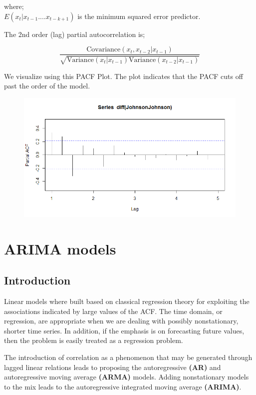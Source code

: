 \documentclass[a4paper]{article}
\theoremstyle{definition}
\begin{document}
where; \\
$ E(x_t |x_{t-1} .... x_{t-k+1}) $ is the minimum squared error predictor. 

The 2nd order (lag) partial autocorrelation is; 

\begin{equation}
\frac{\text{Covariance}(x_t, x_{t-2}| x_{t-1})}{\sqrt{\text{Variance}(x_t|x_{t-1})\text{Variance}(x_{t-2}|x_{t-1})}}
\end{equation}

We visualize using this PACF Plot. The plot indicates that the PACF cuts off past the order of the model. 

\begin{figure}
	[h]
	\centering
	\includegraphics[width=0.8\linewidth]{pacf_jj}
\end{figure}

\section{ARIMA models}
\subsection{Introduction}
Linear models where built based on classical regression theory for exploiting the associations
indicated by large values of the ACF. The time domain, or regression, are appropriate when we are dealing with possibly nonstationary, shorter time series. In addition, if the emphasis is on
forecasting future values, then the problem is easily treated as a regression problem. 

The introduction of correlation as a phenomenon that may be generated through lagged linear relations leads to proposing the autoregressive \textbf{(AR)} and autoregressive moving average \textbf{(ARMA)} models. Adding nonstationary models to the mix leads to the autoregressive integrated moving average \textbf{(ARIMA)}. 
\end{document}
